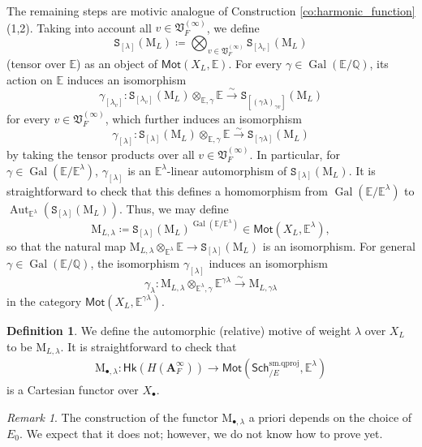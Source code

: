 \documentclass[12pt]{amsart}
\numberwithin{equation}{section}
\theoremstyle{plain}
\theoremstyle{definition}
\newtheorem{definition}[proposition]{Definition}
\theoremstyle{remark}
\newtheorem{remark}[proposition]{Remark}
\renewcommand{\b}[1]{\mathbf{#1}}
\renewcommand{\d}[1]{\mathbb{#1}}
\newcommand{\f}[1]{\mathfrak{#1}}
\renewcommand{\r}[1]{\mathrm{#1}}
\renewcommand{\sf}[1]{\mathsf{#1}}
\renewcommand{\(}{\left(}
\renewcommand{\)}{\right)}
\newcommand{\bA}{\b A}
\newcommand{\dE}{\d E}
\newcommand{\dQ}{\d Q}
\newcommand{\fV}{\f V}
\newcommand{\rM}{\r M}
\newcommand{\tS}{\mathtt{S}}
\newcommand{\smq}{\r{sm.qproj}}
\newcommand{\Sch}{\sf{Sch}}
\newcommand{\Hk}{\sf{Hk}}
\newcommand{\Mot}{\sf{Mot}}
\DeclareMathOperator{\Aut}{Aut}
\DeclareMathOperator{\Gal}{Gal}
\begin{document}
The remaining steps are motivic analogue of Construction \ref{co:harmonic_function}(1,2). Taking into account all $v\in\fV_F^{(\infty)}$, we define
\[
\tS_{[\lambda]}(\rM_L)\coloneqq\bigotimes_{v\in\fV_F^{(\infty)}}\tS_{[\lambda_v]}(\rM_L)
\]
(tensor over $\dE$) as an object of $\Mot(X_L,\dE)$. For every $\gamma\in\Gal(\dE/\dQ)$, its action on $\dE$ induces an isomorphism
\[
\gamma_{[\lambda_v]}\colon\tS_{[\lambda_v]}(\rM_L)\otimes_{\dE,\gamma}\dE\xrightarrow\sim\tS_{[(\gamma\lambda)_{\gamma v}]}(\rM_L)
\]
for every $v\in\fV_F^{(\infty)}$, which further induces an isomorphism
\[
\gamma_{[\lambda]}\colon\tS_{[\lambda]}(\rM_L)\otimes_{\dE,\gamma}\dE\xrightarrow\sim\tS_{[\gamma\lambda]}(\rM_L)
\]
by taking the tensor products over all $v\in\fV_F^{(\infty)}$. In particular, for $\gamma\in\Gal(\dE/\dE^\lambda)$, $\gamma_{[\lambda]}$ is an $\dE^\lambda$-linear automorphism of $\tS_{[\lambda]}(\rM_L)$. It is straightforward to check that this defines a homomorphism from $\Gal(\dE/\dE^\lambda)$ to $\Aut_{\dE^\lambda}(\tS_{[\lambda]}(\rM_L))$. Thus, we may define
\[
\rM_{L,\lambda}\coloneqq\tS_{[\lambda]}(\rM_L)^{\Gal(\dE/\dE^\lambda)}\in\Mot(X_L,\dE^\lambda),
\]
so that the natural map $\rM_{L,\lambda}\otimes_{\dE^\lambda}\dE\to\tS_{[\lambda]}(\rM_L)$ is an isomorphism. For general $\gamma\in\Gal(\dE/\dQ)$, the isomorphism $\gamma_{[\lambda]}$ induces an isomorphism
\[
\gamma_\lambda\colon\rM_{L,\lambda}\otimes_{\dE^\lambda,\gamma}\dE^{\gamma\lambda}\xrightarrow\sim\rM_{L,\gamma\lambda}
\]
in the category $\Mot(X_L,\dE^{\gamma\lambda})$.

\begin{definition}\label{de:motive_automorphic}
We define the automorphic (relative) motive of weight $\lambda$ over $X_L$ to be $\rM_{L,\lambda}$. It is straightforward to check that
\begin{align*}
\rM_{\bullet,\lambda}\colon\Hk(H(\bA_F^\infty))\to\Mot(\Sch^\smq_{/E},\dE^\lambda)
\end{align*}
is a Cartesian functor over $X_\bullet$.
\end{definition}

\begin{remark}
The construction of the functor $\rM_{\bullet,\lambda}$ a priori depends on the choice of $E_0$. We expect that it does not; however, we do not know how to prove yet.
\end{remark}
\end{document}
